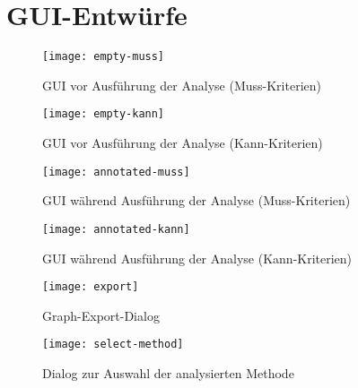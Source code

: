 
\section{GUI-Entwürfe}

\begin{figure}[H]
\caption{GUI vor Ausführung der Analyse (Muss-Kriterien)}
\centering
\texttt{[image: empty-muss]}
\end{figure}

\begin{figure}[H]
\caption{GUI vor Ausführung der Analyse (Kann-Kriterien)}
\centering
\texttt{[image: empty-kann]}
\end{figure}

\begin{figure}[H]
\caption{GUI während Ausführung der Analyse (Muss-Kriterien)}
\centering
\texttt{[image: annotated-muss]}
\end{figure}

\begin{figure}[H]
\caption{GUI während Ausführung der Analyse (Kann-Kriterien)}
\centering
\texttt{[image: annotated-kann]}
\end{figure}

\begin{figure}[H]
\caption{Graph-Export-Dialog}
\centering
\texttt{[image: export]}
\end{figure}

\begin{figure}[H]
\caption{Dialog zur Auswahl der analysierten Methode}
\centering
\texttt{[image: select-method]}
\end{figure}
